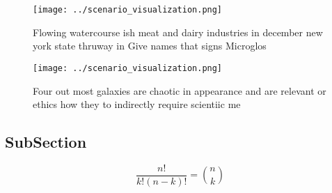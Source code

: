 \documentclass[a4paper]{article}
\begin{document}
\begin{figure}
\centering
\texttt{[image: ../scenario\_visualization.png]}
\caption{Flowing watercourse ish meat and dairy industries in december new york state thruway in Give names that signs Microglos
}
\end{figure}
 
\begin{figure}
\centering
\texttt{[image: ../scenario\_visualization.png]}
\caption{Four out most galaxies are chaotic in appearance and are relevant or ethics how they to indirectly require scientiic me
}
\end{figure}
 
\subsection{SubSection}

\[ \frac{n!}{k!(n-k)!} = \binom{n}{k} \]
\end{document}
